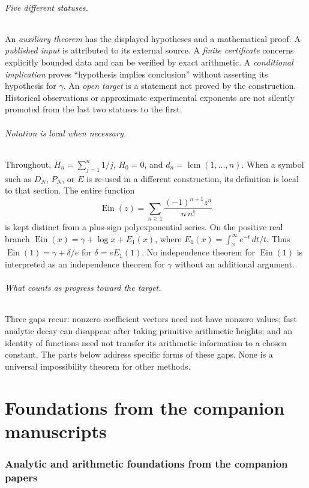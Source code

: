 \documentclass[11pt,a4paper]{article}
\newcommand{\Ein}{\operatorname{Ein}}
\DeclareMathOperator{\lcm}{lcm}
\theoremstyle{definition}
\theoremstyle{remark}
\numberwithin{equation}{section}
\begin{document}
\paragraph{Five different statuses.}
An \emph{auxiliary theorem} has the displayed hypotheses and a mathematical
proof. A \emph{published input} is attributed to its external source. A
\emph{finite certificate} concerns explicitly bounded data and can be
verified by exact arithmetic. A \emph{conditional implication} proves
``hypothesis implies conclusion'' without asserting its hypothesis for
$\gamma$. An \emph{open target} is a statement not proved by the construction.
Historical observations or approximate experimental exponents are not
silently promoted from the last two statuses to the first.

\paragraph{Notation is local when necessary.}
Throughout, $H_n=\sum_{j=1}^n1/j$, $H_0=0$, and $d_n=\lcm(1,\ldots,n)$.
When a symbol such as $D_N$, $P_N$, or $E$ is re-used in a different
construction, its definition is local to that section. The entire function
\[
 \Ein(z)=\sum_{n\ge1}\frac{(-1)^{n+1}z^n}{n\,n!}
\]
is kept distinct from a plus-sign polyexponential series. On the positive
real branch $\Ein(x)=\gamma+\log x+E_1(x)$, where
$E_1(x)=\int_x^\infty e^{-t}\,dt/t$. Thus
$\Ein(1)=\gamma+\delta/e$ for $\delta=eE_1(1)$.
No independence theorem for $\Ein(1)$ is interpreted as an independence
theorem for $\gamma$ without an additional argument.

\paragraph{What counts as progress toward the target.}
Three gaps recur: nonzero coefficient vectors need not have nonzero values;
fast analytic decay can disappear after taking primitive arithmetic
heights; and an identity of functions need not transfer its arithmetic
information to a chosen constant. The parts below address specific forms
of these gaps. None is a universal impossibility theorem for other methods.

\clearpage
\part{Foundations from the companion manuscripts}\label{master:foundations}
\section{Analytic and arithmetic foundations from the companion papers}
\label{fd:sec:foundations}
\end{document}
